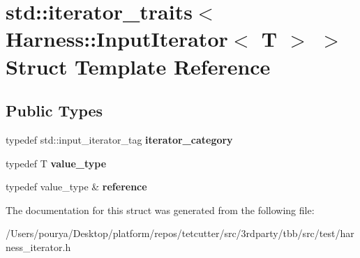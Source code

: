 \hypertarget{structstd_1_1iterator__traits_3_01Harness_1_1InputIterator_3_01T_01_4_01_4}{}\section{std\+:\+:iterator\+\_\+traits$<$ Harness\+:\+:Input\+Iterator$<$ T $>$ $>$ Struct Template Reference}
\label{structstd_1_1iterator__traits_3_01Harness_1_1InputIterator_3_01T_01_4_01_4}
\subsection*{Public Types}
\begin{DoxyCompactItemize}
\item 
\hypertarget{structstd_1_1iterator__traits_3_01Harness_1_1InputIterator_3_01T_01_4_01_4_a54bec9efeed0712eb3f8e6d055ca0316}{}typedef std\+::input\+\_\+iterator\+\_\+tag {\bfseries iterator\+\_\+category}\label{structstd_1_1iterator__traits_3_01Harness_1_1InputIterator_3_01T_01_4_01_4_a54bec9efeed0712eb3f8e6d055ca0316}

\item 
\hypertarget{structstd_1_1iterator__traits_3_01Harness_1_1InputIterator_3_01T_01_4_01_4_ae1cfd94d46f4d770008a58fcb2c67eec}{}typedef T {\bfseries value\+\_\+type}\label{structstd_1_1iterator__traits_3_01Harness_1_1InputIterator_3_01T_01_4_01_4_ae1cfd94d46f4d770008a58fcb2c67eec}

\item 
\hypertarget{structstd_1_1iterator__traits_3_01Harness_1_1InputIterator_3_01T_01_4_01_4_a3094213527270daebe58c024ee384ad0}{}typedef value\+\_\+type \& {\bfseries reference}\label{structstd_1_1iterator__traits_3_01Harness_1_1InputIterator_3_01T_01_4_01_4_a3094213527270daebe58c024ee384ad0}

\end{DoxyCompactItemize}


The documentation for this struct was generated from the following file\+:\begin{DoxyCompactItemize}
\item 
/\+Users/pourya/\+Desktop/platform/repos/tetcutter/src/3rdparty/tbb/src/test/harness\+\_\+iterator.\+h\end{DoxyCompactItemize}
